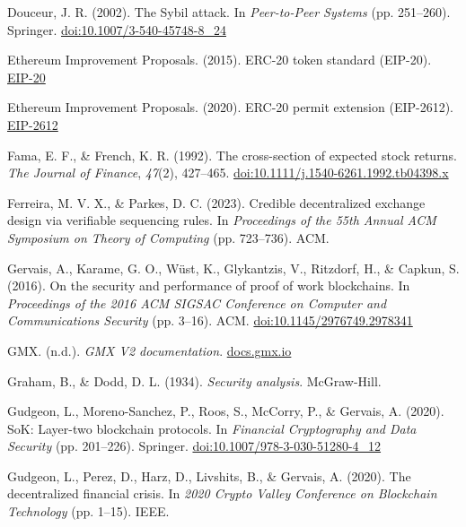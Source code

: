 \begin{enumerate}[label={[\arabic*]}, leftmargin=*, itemsep=0.35em, parsep=0pt]
  \item{}\label{ref:17} Douceur, J. R. (2002). The Sybil attack. In \textit{Peer-to-Peer Systems} (pp. 251--260). Springer. \href{https://doi.org/10.1007/3-540-45748-8_24}{doi:10.1007/3-540-45748-8\_24}
  \item{}\label{ref:18} Ethereum Improvement Proposals. (2015). ERC-20 token standard (EIP-20). \href{https://eips.ethereum.org/EIPS/eip-20}{EIP-20}
  \item{}\label{ref:19} Ethereum Improvement Proposals. (2020). ERC-20 permit extension (EIP-2612). \href{https://eips.ethereum.org/EIPS/eip-2612}{EIP-2612}
  \item{}\label{ref:20} Fama, E. F., \& French, K. R. (1992). The cross-section of expected stock returns. \textit{The Journal of Finance}, \textit{47}(2), 427--465. \href{https://doi.org/10.1111/j.1540-6261.1992.tb04398.x}{doi:10.1111/j.1540-6261.1992.tb04398.x}
  \item{}\label{ref:21} Ferreira, M. V. X., \& Parkes, D. C. (2023). Credible decentralized exchange design via verifiable sequencing rules. In \textit{Proceedings of the 55th Annual ACM Symposium on Theory of Computing} (pp. 723--736). ACM.
  \item{}\label{ref:22} Gervais, A., Karame, G. O., W\"{u}st, K., Glykantzis, V., Ritzdorf, H., \& Capkun, S. (2016). On the security and performance of proof of work blockchains. In \textit{Proceedings of the 2016 ACM SIGSAC Conference on Computer and Communications Security} (pp. 3--16). ACM. \href{https://doi.org/10.1145/2976749.2978341}{doi:10.1145/2976749.2978341}
  \item{}\label{ref:23} GMX. (n.d.). \textit{GMX V2 documentation}. \href{https://docs.gmx.io/}{docs.gmx.io}
  \item{}\label{ref:24} Graham, B., \& Dodd, D. L. (1934). \textit{Security analysis}. McGraw-Hill.
  \item{}\label{ref:25} Gudgeon, L., Moreno-Sanchez, P., Roos, S., McCorry, P., \& Gervais, A. (2020). SoK: Layer-two blockchain protocols. In \textit{Financial Cryptography and Data Security} (pp. 201--226). Springer. \href{https://doi.org/10.1007/978-3-030-51280-4_12}{doi:10.1007/978-3-030-51280-4\_12}
  \item{}\label{ref:26} Gudgeon, L., Perez, D., Harz, D., Livshits, B., \& Gervais, A. (2020). The decentralized financial crisis. In \textit{2020 Crypto Valley Conference on Blockchain Technology} (pp. 1--15). IEEE.

\end{enumerate}
